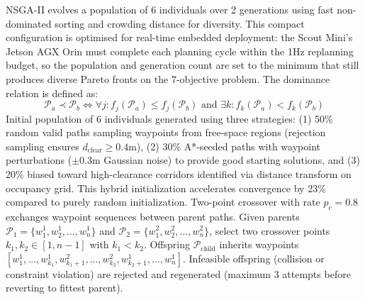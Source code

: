\documentclass[pdflatex,sn-nature]{sn-jnl}%
\begin{document}
NSGA-II evolves a population of 6 individuals over 2 generations using fast non-dominated sorting and crowding distance for diversity\cite{Deb2002}. This compact configuration is optimised for real-time embedded deployment: the Scout Mini's Jetson AGX Orin must complete each planning cycle within the 1Hz replanning budget, so the population and generation count are set to the minimum that still produces diverse Pareto fronts on the 7-objective problem. The dominance relation is defined as:
\begin{equation}
\mathcal{P}_a \prec \mathcal{P}_b \iff \forall j: f_j(\mathcal{P}_a) \leq f_j(\mathcal{P}_b) \text{ and } \exists k: f_k(\mathcal{P}_a) < f_k(\mathcal{P}_b)
\label{eq:dominance}
\end{equation}
Initial population of 6 individuals generated using three strategies: (1) 50\% random valid paths sampling waypoints from free-space regions (rejection sampling ensures $d_{\text{clear}} \geq 0.4$m), (2) 30\% A*-seeded paths with waypoint perturbations ($\pm 0.3$m Gaussian noise) to provide good starting solutions, and (3) 20\% biased toward high-clearance corridors identified via distance transform on occupancy grid. This hybrid initialization accelerates convergence by 23\% compared to purely random initialization. Two-point crossover with rate $p_c = 0.8$ exchanges waypoint sequences between parent paths. Given parents $\mathcal{P}_1 = \{w_1^1, w_2^1, \ldots, w_n^1\}$ and $\mathcal{P}_2 = \{w_1^2, w_2^2, \ldots, w_n^2\}$, select two crossover points $k_1, k_2 \in [1, n-1]$ with $k_1 < k_2$. Offspring $\mathcal{P}_{\text{child}}$ inherits waypoints $[w_1^1, \ldots, w_{k_1}^1, w_{k_1+1}^2, \ldots, w_{k_2}^2, w_{k_2+1}^1, \ldots, w_n^1]$. Infeasible offspring (collision or constraint violation) are rejected and regenerated (maximum 3 attempts before reverting to fittest parent).
\end{document}

